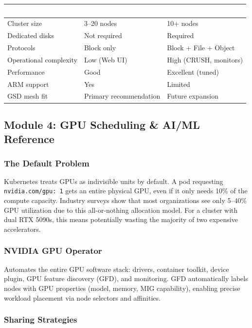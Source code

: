 \documentclass[11pt,letterpaper]{article}
\newcommand{\tableheader}[1]{\textbf{\sffamily\textcolor{white}{#1}}}
\begin{document}
\begin{center}
\begin{tabularx}{\textwidth}{L{3.5cm}XX}
\toprule
{}
\tableheader{Criterion} & \tableheader{Longhorn} & \tableheader{Rook/Ceph} \\
\midrule
Cluster size & 3--20 nodes & 10+ nodes \\
Dedicated disks & Not required & Required \\
Protocols & Block only & Block + File + Object \\
Operational complexity & Low (Web UI) & High (CRUSH, monitors) \\
Performance & Good & Excellent (tuned) \\
ARM support & Yes & Limited \\
GSD mesh fit & Primary recommendation & Future expansion \\
\bottomrule
\end{tabularx}
\end{center}

\subsection{Module 4: GPU Scheduling \& AI/ML Reference}

\subsubsection{The Default Problem}
Kubernetes treats GPUs as indivisible units by default. A pod requesting \texttt{nvidia.com/gpu: 1} gets an entire physical GPU, even if it only needs 10\% of the compute capacity. Industry surveys show that most organizations see only 5--40\% GPU utilization due to this all-or-nothing allocation model. For a cluster with dual RTX 5090s, this means potentially wasting the majority of two expensive accelerators.

\subsubsection{NVIDIA GPU Operator}
Automates the entire GPU software stack: drivers, container toolkit, device plugin, GPU feature discovery (GFD), and monitoring. GFD automatically labels nodes with GPU properties (model, memory, MIG capability), enabling precise workload placement via node selectors and affinities.

\subsubsection{Sharing Strategies}
\end{document}
